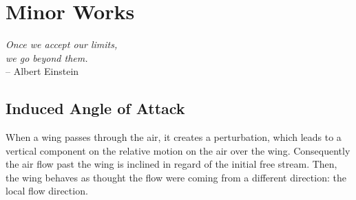 \chapter{Minor Works}
%
%
%
%
%
%
%

\begin{flushright}
	{\smaller
		\textit{Once we accept our limits,\\  we go beyond them.}\\
		-- Albert Einstein}
\end{flushright}

\section{Induced Angle of Attack}
When a wing passes through the air, it creates a perturbation, which leads to a vertical component on the relative motion on the air over the wing. Consequently the air flow past the wing is inclined in regard of the initial free stream. Then, the wing behaves as thought the flow were coming from a different direction: the local flow direction.

